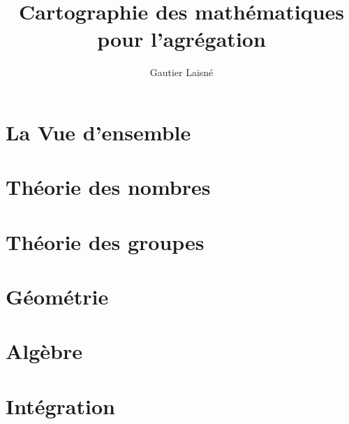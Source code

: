 \documentclass[a4paper, 11pt, twocolumn, oneside, openright]{report}
\theoremstyle{definition}
\begin{document}
\title{Cartographie des mathématiques pour l'agrégation}
\author{Gautier Laisné}
\date{}
\maketitle

\begingroup
\hypersetup{linkcolor=black}
\tableofcontents
\endgroup

\part{La Vue d'ensemble}


\part{Théorie des nombres}


\part{Théorie des groupes}




\part{Géométrie}





\part{Algèbre}








\part{Intégration}



\end{document}
